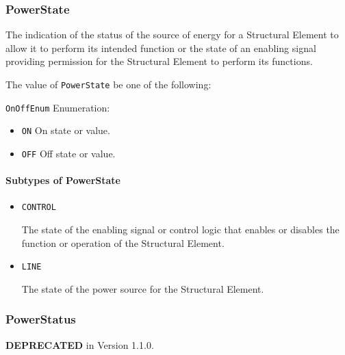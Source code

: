 \subsubsection{PowerState}
\label{sec:PowerState}



The indication of the status of the source of energy for a \gls{Structural Element} to allow it to perform its intended function or the state of an enabling signal providing permission for the \gls{Structural Element} to perform its functions.


The value of \texttt{PowerState} \MUST be one of the following: 


\texttt{OnOffEnum} Enumeration:

\begin{itemize}
\item \texttt{ON} \newline On state or value. 
\item \texttt{OFF} \newline Off state or value. 
\end{itemize}


\paragraph{Subtypes of PowerState}\mbox{}
\label{sec:Subtypes of PowerState}

\begin{itemize}

\item \texttt{CONTROL}


The state of the enabling signal or control logic that enables or disables the function or operation of the \gls{Structural Element}.

\item \texttt{LINE}


The state of the power source for the \gls{Structural Element}.


\end{itemize}





\subsubsection{PowerStatus}
\label{sec:PowerStatus}



\textbf{DEPRECATED} in Version 1.1.0.



